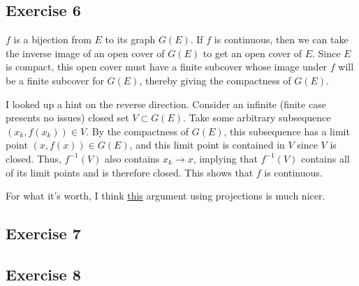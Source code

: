 \subsection{Exercise 6}
$f$ is a bijection from $E$ to its graph $G(E)$. If $f$ is continuous, then we can take the inverse image of
an open cover of $G(E)$ to get an open cover of $E$. Since $E$ is compact, this open cover must have a
finite subcover whose image under $f$ will be a finite subcover for $G(E)$, thereby giving the compactness of
$G(E)$.

I looked up a hint on the reverse direction. Consider an infinite (finite case presents no issues) closed set 
$V \subset G(E)$. Take some arbitrary subsequence $(x_k, f(x_k)) \in V$. 
By the compactness of $G(E)$, this subsequence has a limit point $(x, f(x)) \in G(E)$, and this limit point is
contained in $V$ since $V$ is closed. Thus, $f^{-1} (V)$ also contains $x_k \to x$, implying that $f^{-1} (V)$ 
contains all of its limit points and is therefore closed. This shows that $f$ is continuous.

For what it's worth, I think 
\href{http://at.yorku.ca/cgi-bin/bbqa?forum=ask_an_analyst_2005&task=show_msg&msg=3485.0001.0001.0001}{this}
argument using projections is much nicer.

\subsection{Exercise 7}


\subsection{Exercise 8}

